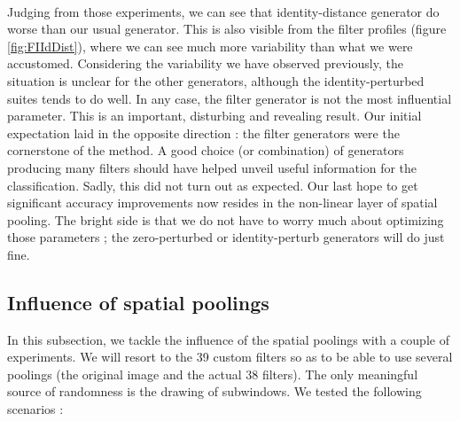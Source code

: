 \documentclass[a4paper]{report}
\begin{document}
	\paragraph{}
	Judging from those experiments, we can see that identity-distance generator do worse than our usual generator. This is also visible from the filter profiles (figure \ref{fig:FIIdDist}), where we can see much more variability than what we were accustomed.
	Considering the variability we have observed previously, the situation is unclear for the other generators, although the identity-perturbed suites tends to do well. In any case, the filter generator is not the most influential parameter. This is an important, disturbing and revealing result. Our initial expectation laid in the opposite direction : the filter generators were the cornerstone of the method. A good choice (or combination) of generators producing many filters should have helped unveil useful information for the classification. Sadly, this did not turn out as expected. Our last hope to get significant accuracy improvements now resides in the non-linear layer of spatial pooling.
	The bright side is that we do not have to worry much about optimizing those parameters ; the zero-perturbed or identity-perturb generators will do just fine.
	
	
	\subsection{Influence of spatial poolings}
	In this subsection, we tackle the influence of the spatial poolings with a couple of experiments. We will resort to the 39 custom filters so as to be able to use several poolings (the original image and the actual 38 filters). The only meaningful source of randomness is the drawing of subwindows. We tested the following scenarios : 
	
\end{document}

